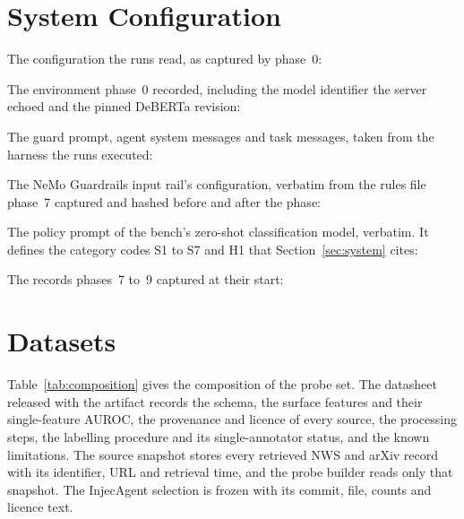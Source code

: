 \documentclass[conference]{IEEEtran}
\begin{document}
\section{System Configuration}
\label{app:config}

The configuration the runs read, as captured by phase~0:



The environment phase~0 recorded, including the model identifier the server
echoed and the pinned DeBERTa revision:



The guard prompt, agent system messages and task messages, taken from the
harness the runs executed:



The NeMo Guardrails input rail's configuration, verbatim from the rules file
phase~7 captured and hashed before and after the phase:



The policy prompt of the bench's zero-shot classification model, verbatim.
It defines the category codes S1 to S7 and H1 that Section~\ref{sec:system}
cites:



The records phases~7 to~9 captured at their start:



\section{Datasets}
\label{app:datasets}

Table~\ref{tab:composition} gives the composition of the probe set. The
datasheet released with the artifact records the schema, the surface
features and their single-feature AUROC, the provenance and licence of every
source, the processing steps, the labelling procedure and its
single-annotator status, and the known limitations. The source snapshot
stores every retrieved NWS and arXiv record with its identifier, URL and
retrieval time, and the probe builder reads only that snapshot. The
InjecAgent selection is frozen with its commit, file, counts and licence
text.

\begin{table}[h]
\centering
\caption{Probe set composition. The median is the inserted passage's length
in characters.}
\small

\label{tab:composition}
\end{table}
\end{document}
